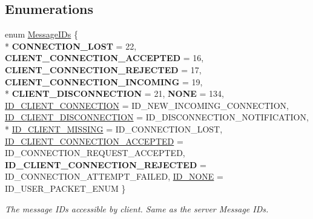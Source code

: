 \subsection*{Enumerations}
\begin{DoxyCompactItemize}
\item 
enum \hyperlink{namespace_champ_net_plugin_a2ade5cfa7cf6c25ab7236c6b54a57821}{Message\-I\-Ds} \{ \\*
{\bfseries C\-O\-N\-N\-E\-C\-T\-I\-O\-N\-\_\-\-L\-O\-S\-T} = 22, 
{\bfseries C\-L\-I\-E\-N\-T\-\_\-\-C\-O\-N\-N\-E\-C\-T\-I\-O\-N\-\_\-\-A\-C\-C\-E\-P\-T\-E\-D} = 16, 
{\bfseries C\-L\-I\-E\-N\-T\-\_\-\-C\-O\-N\-N\-E\-C\-T\-I\-O\-N\-\_\-\-R\-E\-J\-E\-C\-T\-E\-D} = 17, 
{\bfseries C\-L\-I\-E\-N\-T\-\_\-\-C\-O\-N\-N\-E\-C\-T\-I\-O\-N\-\_\-\-I\-N\-C\-O\-M\-I\-N\-G} = 19, 
\\*
{\bfseries C\-L\-I\-E\-N\-T\-\_\-\-D\-I\-S\-C\-O\-N\-N\-E\-C\-T\-I\-O\-N} = 21, 
{\bfseries N\-O\-N\-E} = 134, 
\hyperlink{namespace_champ_net_plugin_a2ade5cfa7cf6c25ab7236c6b54a57821aecc0564c52e3106cfe012e5533b080da}{I\-D\-\_\-\-C\-L\-I\-E\-N\-T\-\_\-\-C\-O\-N\-N\-E\-C\-T\-I\-O\-N} = I\-D\-\_\-\-N\-E\-W\-\_\-\-I\-N\-C\-O\-M\-I\-N\-G\-\_\-\-C\-O\-N\-N\-E\-C\-T\-I\-O\-N, 
\hyperlink{namespace_champ_net_plugin_a2ade5cfa7cf6c25ab7236c6b54a57821a2ed0fbbbbe782bca6c76277c89050ad9}{I\-D\-\_\-\-C\-L\-I\-E\-N\-T\-\_\-\-D\-I\-S\-C\-O\-N\-N\-E\-C\-T\-I\-O\-N} = I\-D\-\_\-\-D\-I\-S\-C\-O\-N\-N\-E\-C\-T\-I\-O\-N\-\_\-\-N\-O\-T\-I\-F\-I\-C\-A\-T\-I\-O\-N, 
\\*
\hyperlink{namespace_champ_net_plugin_a2ade5cfa7cf6c25ab7236c6b54a57821a31932f93b241ffddf903d32af0fc2155}{I\-D\-\_\-\-C\-L\-I\-E\-N\-T\-\_\-\-M\-I\-S\-S\-I\-N\-G} = I\-D\-\_\-\-C\-O\-N\-N\-E\-C\-T\-I\-O\-N\-\_\-\-L\-O\-S\-T, 
\hyperlink{namespace_champ_net_plugin_a2ade5cfa7cf6c25ab7236c6b54a57821a0295101371b4a70a1c007a4f6e206e1d}{I\-D\-\_\-\-C\-L\-I\-E\-N\-T\-\_\-\-C\-O\-N\-N\-E\-C\-T\-I\-O\-N\-\_\-\-A\-C\-C\-E\-P\-T\-E\-D} = I\-D\-\_\-\-C\-O\-N\-N\-E\-C\-T\-I\-O\-N\-\_\-\-R\-E\-Q\-U\-E\-S\-T\-\_\-\-A\-C\-C\-E\-P\-T\-E\-D, 
{\bfseries I\-D\-\_\-\-C\-L\-I\-E\-N\-T\-\_\-\-C\-O\-N\-N\-E\-C\-T\-I\-O\-N\-\_\-\-R\-E\-J\-E\-C\-T\-E\-D} = I\-D\-\_\-\-C\-O\-N\-N\-E\-C\-T\-I\-O\-N\-\_\-\-A\-T\-T\-E\-M\-P\-T\-\_\-\-F\-A\-I\-L\-E\-D, 
\hyperlink{namespace_champ_net_plugin_a2ade5cfa7cf6c25ab7236c6b54a57821aad940f5ef8633f353088061ccf06623d}{I\-D\-\_\-\-N\-O\-N\-E} = I\-D\-\_\-\-U\-S\-E\-R\-\_\-\-P\-A\-C\-K\-E\-T\-\_\-\-E\-N\-U\-M
 \}
\begin{DoxyCompactList}\small\item\em The message I\-Ds accessible by client. Same as the server Message I\-Ds. \end{DoxyCompactList}\item 

\end{DoxyCompactItemize}
